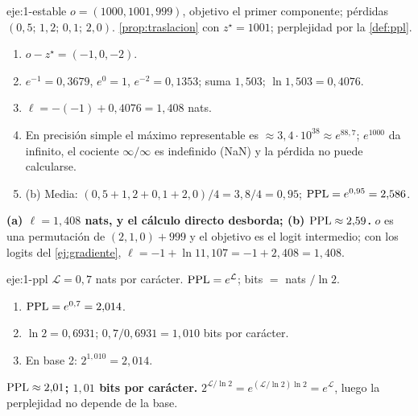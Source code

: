 \begin{solucion}{eje:1-estable}
\datos $o=(1000,1001,999)$, objetivo el primer componente; pérdidas $(0{,}5;\allowbreak\,1{,}2;\allowbreak\,0{,}1;\allowbreak\,2{,}0)$.
\planteamiento \cref{prop:traslacion} con $z^{\star}=1001$; perplejidad por la \cref{def:ppl}.
\pasos
\begin{enumerate}[label=\arabic*.]
  \item $o-z^{\star}=(-1,0,-2)$.
  \item $e^{-1}=0{,}3679$, $e^{0}=1$, $e^{-2}=0{,}1353$; suma $1{,}503$; $\ln 1{,}503=0{,}4076$.
  \item $\ell=-(-1)+0{,}4076=1{,}408$ nats.
  \item En precisión simple el máximo representable es $\approx 3{,}4\cdot 10^{38}\approx e^{88{,}7}$; $e^{1000}$ da infinito, el cociente $\infty/\infty$ es indefinido (NaN) y la pérdida no puede calcularse.
  \item (b) Media: $(0{,}5+1{,}2+0{,}1+2{,}0)/4=3{,}8/4=0{,}95$; $\operatorname{PPL}=e^{0{,}95}=2{,}586$.
\end{enumerate}
\resultado \textbf{(a) $\ell=1{,}408$ nats, y el cálculo directo desborda; (b) $\operatorname{PPL}\approx 2{,}59$.}
\comprobacion $o$ es una permutación de $(2,1,0)+999$ y el objetivo es el logit intermedio; con los logits del \cref{ej:gradiente}, $\ell=-1+\ln 11{,}107=-1+2{,}408=1{,}408$.
\end{solucion}

\begin{solucion}{eje:1-ppl}
\datos $\mathcal{L}=0{,}7$ nats por carácter.
\planteamiento $\operatorname{PPL}=e^{\mathcal{L}}$; bits $=$ nats $/\ln 2$.
\pasos
\begin{enumerate}[label=\arabic*.]
  \item $\operatorname{PPL}=e^{0{,}7}=2{,}014$.
  \item $\ln 2=0{,}6931$; $0{,}7/0{,}6931=1{,}010$ bits por carácter.
  \item En base 2: $2^{1{,}010}=2{,}014$.
\end{enumerate}
\resultado \textbf{$\operatorname{PPL}\approx 2{,}01$; $1{,}01$ bits por carácter.}
\comprobacion $2^{\mathcal{L}/\ln 2}=e^{(\mathcal{L}/\ln 2)\ln 2}=e^{\mathcal{L}}$, luego la perplejidad no depende de la base.
\end{solucion}

